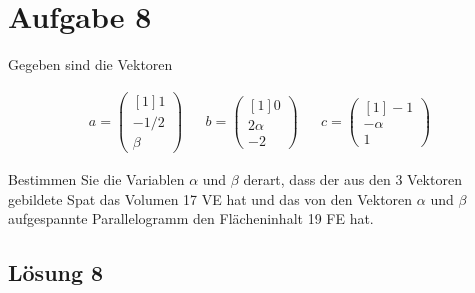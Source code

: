 \documentclass[main.tex]{subfiles}
\begin{document}
\section{Aufgabe 8}
Gegeben sind die Vektoren

\begin{align*}
    a=\begin{pmatrix}[1]
    1\\
    -1/2\\
    \beta
    \end{pmatrix} & & b=\begin{pmatrix}[1]
    0\\
    2\alpha \\
    -2
    \end{pmatrix} & & c=\begin{pmatrix}[1]
    -1\\
    -\alpha \\
    1
    \end{pmatrix}
\end{align*}

Bestimmen Sie die Variablen $\alpha$ und $\beta$ derart, dass der aus den 3 Vektoren gebildete Spat das Volumen 17 VE hat und das von den Vektoren $\alpha$ und $\beta$ aufgespannte Parallelogramm den Flächeninhalt 19 FE hat.

\subsection{Lösung 8}
\end{document}
